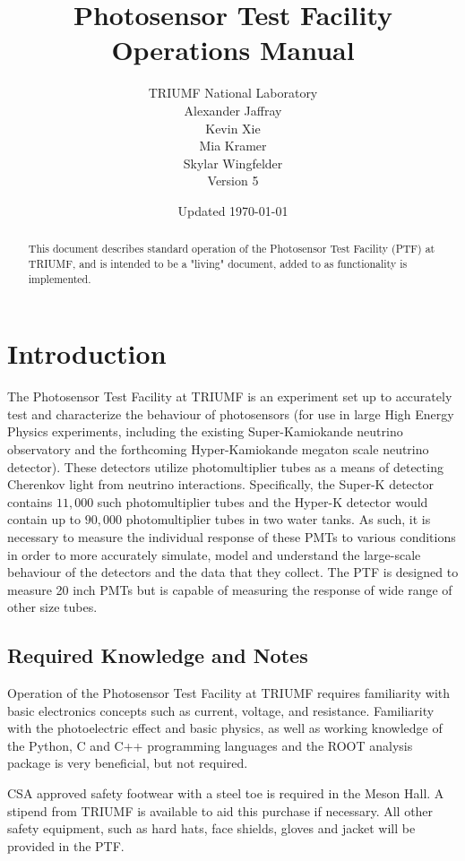 \documentclass[twoside,letterpaper]{refart}
\title{Photosensor Test Facility Operations Manual}
\author{TRIUMF National Laboratory \\
Alexander Jaffray \\
Kevin Xie \\
Mia Kramer \\
Skylar Wingfelder\\
Version 5}
\date{Updated \today}
\begin{document}
\maketitle

\begin{abstract}
	This document describes standard operation of the Photosensor Test Facility (PTF) at TRIUMF, and is intended to be a "living" document, added to as functionality is implemented.
\end{abstract}
\tableofcontents

\newpage



\section{Introduction}

The Photosensor Test Facility at TRIUMF is an experiment set up to accurately test and characterize the behaviour of photosensors (for use in large High Energy Physics experiments, including the existing Super-Kamiokande neutrino observatory and the forthcoming Hyper-Kamiokande megaton scale neutrino detector). These detectors utilize photomultiplier tubes as a means of detecting Cherenkov light from neutrino interactions. Specifically, the Super-K detector contains $11,000$ such photomultiplier tubes and the Hyper-K detector would contain up to $90,000$ photomultiplier tubes in two water tanks. As such, it is necessary to measure the individual response of these PMTs to various conditions in order to more accurately simulate, model and understand the large-scale behaviour of the detectors and the data that they collect. The PTF is designed to measure 20 inch PMTs but is capable of measuring the response of wide range of other size tubes.

\subsection{Required Knowledge and Notes}

Operation of the Photosensor Test Facility at TRIUMF requires familiarity with basic electronics concepts such as current, voltage, and resistance. Familiarity with the photoelectric effect and basic physics, as well as working knowledge of the Python, C and C++ programming languages and the ROOT analysis package is very beneficial, but not required.

CSA approved safety footwear with a steel toe is required in the Meson Hall. A stipend from TRIUMF is available to aid this purchase if necessary. All other safety equipment, such as hard hats, face shields, gloves and jacket will be provided in the PTF.
\end{document}
